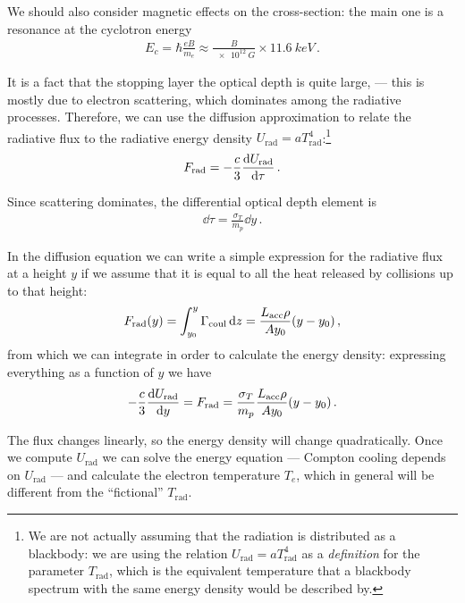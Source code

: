 \documentclass[main.tex]{subfiles}
\begin{document}
We should also consider magnetic effects on the cross-section: the main one is a resonance at the cyclotron energy 
%
\begin{align}
E_c = \hbar \frac{e B}{m_e} \approx \frac{B}{\SI{e12}{G}} \times \SI{11.6}{keV}
\,.
\end{align}

It is a fact that the stopping layer the optical depth is quite large,  --- this is mostly due to electron scattering, which dominates among the radiative processes. 
Therefore, we can use the diffusion approximation to relate the radiative flux to the radiative energy density \(U_{\text{rad}} = a T _{\text{rad}}^{4}\):\footnote{We are not actually assuming that the radiation is distributed as a blackbody: we are using the relation \(U _{\text{rad}} = aT _{\text{rad}}^{4}\) as a \emph{definition} for the parameter \(T _{\text{rad}}\), which is the equivalent temperature that a blackbody spectrum with the same energy density would be described by. }
%
\begin{align}
F _{\text{rad}} = - \frac{c}{3} \dv{U _{\text{rad}}}{\tau }
\,.
\end{align}

Since scattering dominates, the differential optical depth element is 
%
\begin{align}
\dd{\tau } = \frac{\sigma _T}{m_p} \dd{y}
\,.
\end{align}

In the diffusion equation we can write a simple expression for the radiative flux at a height \(y\) if we assume that it is equal to all the heat released by collisions up to that height:
%
\begin{align}
F _{\text{rad}} (y) = \int_{y_0 }^{y} \Gamma _{\text{coul}} \dd{z} 
= \frac{L _{\text{acc}} \rho }{A y_0 } \qty(y - y_0 )
\,,
\end{align}
%
from which we can integrate in order to calculate the energy density: expressing everything as a function of \(y\) we have
%
\begin{align}
- \frac{c}{3} \dv{U _{\text{rad}}}{y } = F _{\text{rad}} = \frac{\sigma _T}{m_p} \frac{L _{\text{acc}} \rho }{A y_0 } \qty(y - y_0 )
\,.
\end{align}

The flux changes linearly, so the energy density will change quadratically. 
Once we compute \(U _{\text{rad}}\) we can solve the energy equation --- Compton cooling depends on \(U _{\text{rad}}\) --- and calculate the electron temperature \(T_e\), which in general will be different from the ``fictional'' \(T _{\text{rad}}\). 
\end{document}
